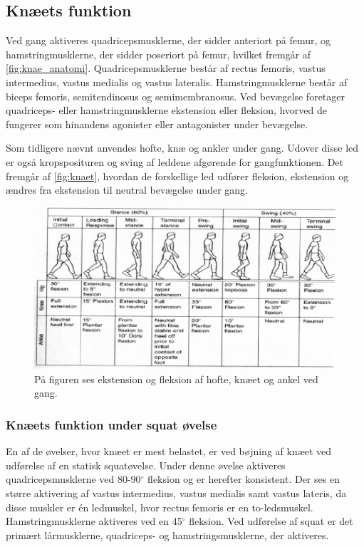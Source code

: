 \subsection{Knæets funktion}
Ved gang aktiveres quadricepsmusklerne, der sidder anteriort på femur, og hamstringmusklerne, der sidder poseriort på femur, hvilket fremgår af \autoref{fig:knae_anatomi}. Quadricepsmusklerne består af rectus femoris, vastus intermedius, vastus medialis og vastus lateralis. Hamstringmusklerne består af biceps femoris, semitendinosus og semimembranosus. Ved bevægelse foretager quadriceps- eller hamstringmusklerne ekstension eller fleksion, hvorved de fungerer som hinandens agonister eller antagonister under bevægelse. 

Som tidligere nævnt anvendes hofte, knæ og ankler under gang. Udover disse led er også kropsposituren og sving af leddene afgørende for gangfunktionen. Det fremgår af \autoref{fig:knaet}, hvordan de forskellige led udfører fleksion, ekstension og ændres fra ekstension til neutral bevægelse under gang.\citep{martini2012}

\begin{figure} [H]
\centering
\includegraphics[width=1\textwidth]{figures/knaet}
\caption{På figuren ses ekstension og fleksion af hofte, knæet og ankel ved gang.}
\label{fig:knaet}
\end{figure} 

\subsubsection{Knæets funktion under squat øvelse}
En af de øvelser, hvor knæet er mest belastet, er ved bøjning af knæet ved udførelse af en statisk squatøvelse. Under denne øvelse aktiveres quadricepsmusklerne ved 80-90$^{\circ}$ fleksion og er herefter konsistent. Der ses en større aktivering af vastus intermedius, vastus medialis samt vastus lateris, da disse muskler er én ledmuskel, hvor rectus femoris er en to-ledsmuskel. Hamstringmusklerne aktiveres ved en 45$^{\circ}$ fleksion.\citep{schoenfeld2010}
Ved udførelse af squat er det primært lårmusklerne, quadriceps- og hamstringsmusklerne, der aktiveres. 


